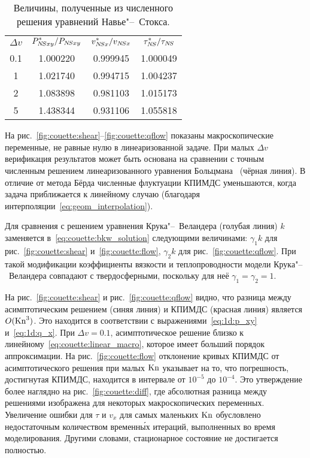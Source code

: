 \begin{table}
    \centering
    \caption{Величины, полученные из численного решения уравнений Навье"--~Стокса.}
    \label{table:NS_params}
    \begin{tabular}{cccc}
        \(\Delta{v}\) & \(\displaystyle P_{N\!S xy}^*/P_{N\!S xy}\) & \(\displaystyle v_{N\!S x}^*/v_{N\!S x}\) & \(\displaystyle \tau_{N\!S}^*/\tau_{N\!S}\) \\[3pt]
        0.1 & 1.000220 & 0.999945 & 1.000049 \\
          1 & 1.021740 & 0.994715 & 1.004237 \\
          2 & 1.083898 & 0.981103 & 1.015173 \\
          5 & 1.438344 & 0.931106 & 1.055818 \\
    \end{tabular}
\end{table}

На рис.~\ref{fig:couette:shear}--\ref{fig:couette:qflow} показаны макроскопические переменные,
не равные нулю в линеаризованной задаче.
При малых \(\Delta{v}\) верификация результатов может быть основана на сравнении с точным численным решением
линеаризованного уравнения Больцмана~\cite{Ohwada1990} (чёрная линия).
В отличие от метода Бёрда численные флуктуации КПИМДС уменьшаются, когда задача приближается к линейному случаю
(благодаря интерполяции~\eqref{eq:geom_interpolation}).

Для сравнения с решением уравнения Крука"--~Веландера (голубая линия)
\(k\) заменяется в~\eqref{eq:couette:bkw_solution} следующими величинами:
\(\gamma_1k\) для рис.~\ref{fig:couette:shear} и~\ref{fig:couette:flow}, \(\gamma_2k\) для рис.~\ref{fig:couette:qflow}.
При такой модификации коэффициенты вязкости и теплопроводности модели Крука"--~Веландера
совпадают с твердосферными, поскольку для неё \(\gamma_1=\gamma_2=1\).

На рис.~\ref{fig:couette:shear} и рис.~\ref{fig:couette:qflow} видно,
что разница между асимптотическим решением (синяя линия) и КПИМДС (красная линия) является \(O(\mathrm{Kn}^3)\).
Это находится в соответствии с выражениями~\eqref{eq:1d:p_xy} и~\eqref{eq:1d:q_x}.
При \(\Delta{v}=0.1\), асимптотическое решение близко к линейному~\eqref{eq:couette:linear_macro},
которое имеет больший порядок аппроксимации.
На рис.~\ref{fig:couette:flow} отклонение кривых КПИМДС от асимптотического решения при малых \(\mathrm{Kn}\)
указывает на то, что погрешность, достигнутая КПИМДС, находится в интервале от \(10^{-5}\) до \(10^{-4}\).
Это утверждение более наглядно на рис.~\ref{fig:couette:diff},
где абсолютная разница между решениями изображена для некоторых макроскопических переменных.
Увеличение ошибки для \(\tau\) и \(v_x\) для самых маленьких \(\mathrm{Kn}\)
обусловлено недостаточным количеством временн\'{ы}х итераций, выполненных во время моделирования.
Другими словами, стационарное состояние не достигается полностью.

